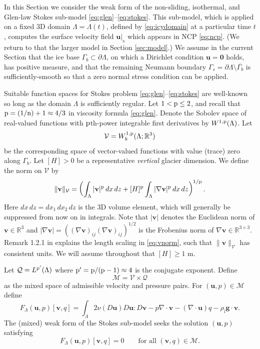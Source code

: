 \documentclass[hidelinks,onefignum,onetabnum,final]{siamart220329}  %
\newcommand{\RR}{\mathbb{R}}
\newcommand{\grad}{\nabla}
\newcommand{\Div}{\nabla\cdot}
\newcommand{\bg}{\mathbf{g}}
\newcommand{\bu}{\mathbf{u}}
\newcommand{\bv}{\mathbf{v}}
\newcommand{\bzero}{\bm{0}}
\newcommand{\cQ}{\mathcal{Q}}
\newcommand{\cV}{\mathcal{V}}
\newcommand{\nn}{{\text{\textnormal{n}}}}
\newcommand{\pp}{{\text{\textnormal{p}}}}
\newcommand{\rhoi}{\rho_{\text{i}}}
\begin{document}
In this Section we consider the weak form of the non-sliding, isothermal, and Glen-law Stokes sub-model \eqref{eq:glen}--\eqref{eq:stokes}.  This sub-model, which is applied on a fixed 3D domain $\Lambda = \Lambda(t)$, defined by \eqref{eq:icydomain} at a particular time $t$, computes the surface velocity field $\bu|_s$ which appears in NCP \eqref{eq:ncp}.  (We return to that the larger model in Section \ref{sec:model}.)  We assume in the current Section that the ice base $\Gamma_b\subset\partial \Lambda$, on which a Dirichlet condition $\bu=\bzero$ holds, has positive measure, and that the remaining Neumann boundary $\Gamma_s = \partial \Lambda \setminus \overline{\Gamma_b}$ is sufficiently-smooth so that a zero normal stress condition can be applied.

Suitable function spaces for Stokes problem \eqref{eq:glen}--\eqref{eq:stokes} are well-known so long as the domain $\Lambda$ is sufficiently regular.  Let $1 < \pp \le 2$, and recall that $\pp=(1/\nn)+1\approx 4/3$ in viscosity formula \eqref{eq:glen}.  Denote the Sobolev space \cite{Evans2010} of real-valued functions with $\pp$th-power integrable first derivatives by $W^{1,\pp}(\Lambda)$.  Let
\begin{equation}
\cV = W_b^{1,\pp}(\Lambda; \RR^3) \label{eq:defineV}
\end{equation}
be the corresponding space of vector-valued functions with value (trace) zero along $\Gamma_b$.  Let $[H]>0$ be a representative \emph{vertical} glacier dimension.  We define the norm on $\cV$ by
\begin{equation}
\|\bv\|_{\cV} = \left(\int_\Lambda |\bv|^\pp\,dx\,dz + [H]^\pp \int_\Lambda |\grad\bv|^\pp\,dx\,dz\right)^{1/\pp}. \label{eq:vnorm}
\end{equation}
Here $dx\,dz = dx_1\,dx_2\,dz$ is the 3D volume element, which will generally be suppressed from now on in integrals.  Note that $|\bv|$ denotes the Euclidean norm of $\bv\in\RR^3$ and $|\grad\bv|=\left((\grad\bv)_{ij} (\grad\bv)_{ij}\right)^{1/2}$ is the Frobenius norm of $\grad\bv\in\RR^{3\times 3}$.  Remark 1.2.1 in \cite{BoffiBrezziFortin2013} explains the length scaling in \eqref{eq:vnorm}, such that $\|\bv\|_{\cV}$ has consistent units.  We will assume throughout that $[H] \ge 1$ m.

Let $\cQ=L^{\pp'}(\Lambda)$ where $\pp'=\pp/(\pp-1)\approx 4$ is the conjugate exponent.  Define
\begin{equation}
\mathcal{M} = \cV \times \cQ \label{eq:glenstokes:mixedspace}
\end{equation}
as the mixed space of admissible velocity and pressure pairs.  For $(\bu,p) \in \mathcal{M}$ define
\begin{equation}
F_\Lambda(\bu,p)[\bv,q] = \int_\Lambda 2 \nu(D\bu) D\bu : D\bv - p \Div\bv - (\Div\bu) q - \rhoi \bg \cdot \bv. \label{eq:glenstokes:fcnl}
\end{equation}
The (mixed) weak form of the Stokes sub-model seeks the solution $(\bu,p)$ satisfying
\begin{equation}
F_\Lambda(\bu,p)[\bv,q] = 0 \qquad \text{for all } (\bv,q) \in \mathcal{M}. \label{eq:glenstokes:weak}
\end{equation}
\end{document}
